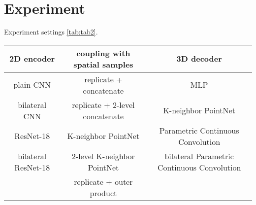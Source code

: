 \section{Experiment}
Experiment settings \ref{tab:tab2}.
\begin{table*}[h]
	\centering
	\caption{Network configurations for mesh generation from single image}\label{tab:tab2}
	\begin{tabular}{ c | c | c }
		2D encoder & coupling with spatial samples & 3D decoder \\
		\hline
		 plain CNN & replicate + concatenate & MLP \\
		 bilateral CNN & replicate + 2-level concatenate & K-neighbor PointNet\\
		ResNet-18 & K-neighbor PointNet & Parametric Continuous Convolution\\ 
		bilateral ResNet-18 &  2-level K-neighbor PointNet & bilateral Parametric Continuous Convolution\\
		& replicate + outer product &
	\end{tabular}
\end{table*}